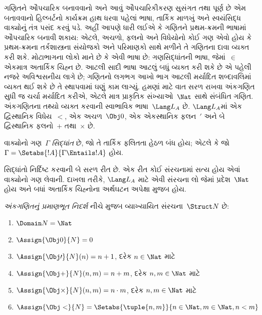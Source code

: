 \label{guunit:OLP-0277}


ગણિતને ઔપચારિક બનાવવાનો અને આવું ઔપચારિકીકરણ
સુસંગત તથા પૂર્ણ છે એમ બતાવવાનો હિલ્બર્ટનો
કાર્યક્રમ હાથ ધરવા પહેલાં ભાષા, તાર્કિક માળખું
અને સ્વયંસિદ્ધ વાક્યોનું તંત્ર પસંદ કરવું પડે.
અહીં આપણે ધારી લઈએ કે ગણિતને પ્રથમ-ક્રમની
ભાષામાં ઔપચારિક બનાવી શકાય: એટલે, અચળો,
ફલનો અને વિધેયોનો કોઈ ગણ એવો
હોય કે પ્રથમ-ક્રમના તર્કશાસ્ત્રના સંયોજકો અને
પરિમાણકો સાથે મળીને તે ગણિતના દાવા વ્યક્ત
કરી શકે. મોટાભાગના લોકો માને છે કે એવી ભાષા
છે: ગણસિદ્ધાંતની ભાષા, જેમાં~$\in$ એકમાત્ર
અતાર્કિક ચિહ્ન છે. આટલી સાદી ભાષા આટલું બધું
વ્યક્ત કરી શકે છે એ પહેલી નજરે અવિશ્વસનીય
લાગે છે; ગણિતનો લગભગ આખો ભાગ આટલી
મર્યાદિત શબ્દાવલિમાં વ્યક્ત થઈ શકે છે તે
સ્થાપવામાં ઘણું કામ લાગ્યું. હમણાં માટે વાત
સરળ રાખવા અંકગણિત સુધી જ ચર્ચા મર્યાદિત
કરીએ, એટલે માત્ર પ્રાકૃતિક સંખ્યાઓ~$\Nat$
સાથે સંબંધિત ગણિત. અંકગણિતના તથ્યો વ્યક્ત
કરવાની સ્વાભાવિક ભાષા~$\Lang L_A$ છે. $\Lang L_A$માં
એક દ્વિસ્થાનિક વિધેય~$<$, એક
અચળ~$\Obj 0$, એક એકસ્થાનિક
ફલન~$\prime$ અને બે દ્વિસ્થાનિક
ફલનો~$+$ તથા~$\times$ છે.

\begin{defn}
વાક્યોનો ગણ~$\Gamma$ \emph{સિદ્ધાંત} છે, જો
તે તાર્કિક ફલિતતા હેઠળ બંધ હોય; એટલે કે જો
$\Gamma = \Setabs{!A}{\Gamma \Entails
!A}$ હોય.
\end{defn}

સિદ્ધાંતો નિર્દિષ્ટ કરવાની બે સરળ રીત છે. એક
રીત કોઈ સંરચનામાં સત્ય હોય એવાં
વાક્યોનો ગણ લેવાની. દાખલા તરીકે,
$\Lang L_A$ માટે એવી સંરચના લો જેમાં
પ્રદેશ~$\Nat$ હોય અને બધાં અતાર્કિક
ચિહ્નોના અર્થઘટન અપેક્ષા મુજબ હોય.

\begin{defn}
\emph{અંકગણિતનું પ્રમાણભૂત નિદર્શ} નીચે મુજબ
વ્યાખ્યાયિત સંરચના~$\Struct N$ છે:
\begin{enumerate}
\item $\Domain N = \Nat$
\item $\Assign{\Obj 0}{N} = 0$
\item $\Assign{\Obj \prime}{N}(n) = n + 1$, દરેક $n \in \Nat$ માટે
\item $\Assign{\Obj +}{N}(n, m) = n + m$, દરેક $n, m \in \Nat$ માટે
\item $\Assign{\Obj \times}{N}(n, m) = n\cdot m$, દરેક $n, m \in \Nat$ માટે
\item $\Assign{\Obj <}{N} = \Setabs{\tuple{n, m}}{n \in \Nat, m \in
  \Nat, n < m}$
\end{enumerate}
\end{defn}

